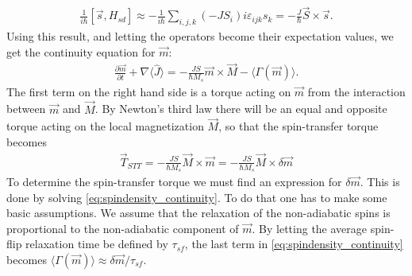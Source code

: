 \documentclass[12pt, a4paper, twoside, openright]{article}		%
\numberwithin{equation}{section}
\begin{document}
\begin{align}
\frac{1}{i\hbar} \left[ \vec{s}, H_{sd} \right] \approx - \frac{1}{i\hbar} \sum_{i,j, k} (-J S_i) i\varepsilon_{ijk}  s_k = -\frac{J}{\hbar} \vec{S} \times \vec{s}.
\end{align}
Using this result, and letting the operators become their expectation values, we get the continuity equation for $\vec{m}$:
\begin{align}
\label{eq:spindensity_continuity}
\frac{\partial \vec{m}}{\partial t} + \nabla \langle\hat{J}\rangle = -\frac{J S}{\hbar M_s} \vec{m} \times \vec{M} - \langle\Gamma(\vec{m})\rangle.
\end{align}
The first term on the right hand side is a torque acting on $\vec{m}$ from the interaction between $\vec{m}$ and $\vec{M}$. By Newton's third law there will be an equal and opposite torque acting on the local magnetization $\vec{M}$, so that the spin-transfer torque becomes
\begin{align}
\label{eq:STT}
\vec{T}_{STT} = -\frac{J S}{\hbar M_s} \vec{M} \times \vec{m} = -\frac{J S}{\hbar M_s} \vec{M} \times \delta\vec{m}
\end{align}
To determine the spin-transfer torque we must find an expression for $\delta\vec{m}$. This is done by solving \eqref{eq:spindensity_continuity}. To do that one has to make some basic assumptions. We assume that the relaxation of the non-adiabatic spins is proportional to the non-adiabatic component of $\vec{m}$. By letting the average spin-flip relaxation time be defined by $\tau_{sf}$, the last term in \eqref{eq:spindensity_continuity} becomes $\langle\Gamma(\vec{m})\rangle \approx \delta\vec{m}/\tau_{sf}$. 
\end{document}
